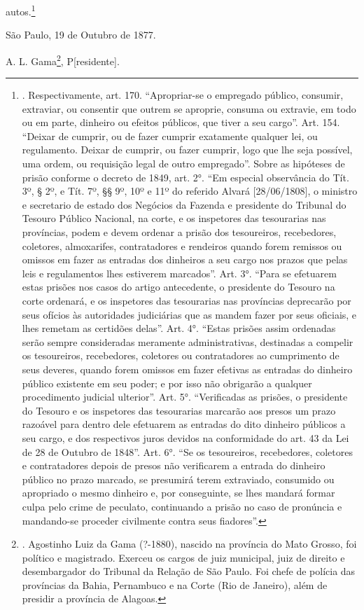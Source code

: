 autos.\footnote{. Respectivamente, art. 170. ``Apropriar-se o empregado
  público, consumir, extraviar, ou consentir que outrem se aproprie,
  consuma ou extravie, em todo ou em parte, dinheiro ou efeitos
  públicos, que tiver a seu cargo''. Art. 154. ``Deixar de cumprir, ou
  de fazer cumprir exatamente qualquer lei, ou regulamento. Deixar de
  cumprir, ou fazer cumprir, logo que lhe seja possível, uma ordem, ou
  requisição legal de outro empregado''. Sobre as hipóteses de prisão
  conforme o decreto de 1849, art. 2°. ``Em especial observância do Tít.
  3º, § 2º, e Tít. 7º, §§ 9º, 10º e 11º do referido Alvará
  {[}28/06/1808{]}, o ministro e secretario de estado dos Negócios da
  Fazenda e presidente do Tribunal do Tesouro Público Nacional, na
  corte, e os inspetores das tesourarias nas províncias, podem e devem
  ordenar a prisão dos tesoureiros, recebedores, coletores, almoxarifes,
  contratadores e rendeiros quando forem remissos ou omissos em fazer as
  entradas dos dinheiros a seu cargo nos prazos que pelas leis e
  regulamentos lhes estiverem marcados''. Art. 3°. ``Para se efetuarem
  estas prisões nos casos do artigo antecedente, o presidente do Tesouro
  na corte ordenará, e os inspetores das tesourarias nas províncias
  deprecarão por seus ofícios às autoridades judiciárias que as mandem
  fazer por seus oficiais, e lhes remetam as certidões delas''. Art. 4°.
  ``Estas prisões assim ordenadas serão sempre consideradas meramente
  administrativas, destinadas a compelir os tesoureiros, recebedores,
  coletores ou contratadores ao cumprimento de seus deveres, quando
  forem omissos em fazer efetivas as entradas do dinheiro público
  existente em seu poder; e por isso não obrigarão a qualquer
  procedimento judicial ulterior''. Art. 5°. ``Verificadas as prisões, o
  presidente do Tesouro e os inspetores das tesourarias marcarão aos
  presos um prazo razoável para dentro dele efetuarem as entradas do
  dito dinheiro públicos a seu cargo, e dos respectivos juros devidos na
  conformidade do art. 43 da Lei de 28 de Outubro de 1848''. Art. 6°.
  ``Se os tesoureiros, recebedores, coletores e contratadores depois de
  presos não verificarem a entrada do dinheiro público no prazo marcado,
  se presumirá terem extraviado, consumido ou apropriado o mesmo
  dinheiro e, por conseguinte, se lhes mandará formar culpa pelo crime
  de peculato, continuando a prisão no caso de pronúncia e mandando-se
  proceder civilmente contra seus fiadores''.}

São Paulo, 19 de Outubro de 1877.

A. L. Gama\footnote{. Agostinho Luiz da Gama (?-1880), nascido na
  província do Mato Grosso, foi político e magistrado. Exerceu os cargos
  de juiz municipal, juiz de direito e desembargador do Tribunal da
  Relação de São Paulo. Foi chefe de polícia das províncias da Bahia,
  Pernambuco e na Corte (Rio de Janeiro), além de presidir a província
  de Alagoas.}, P{[}residente{]}.


